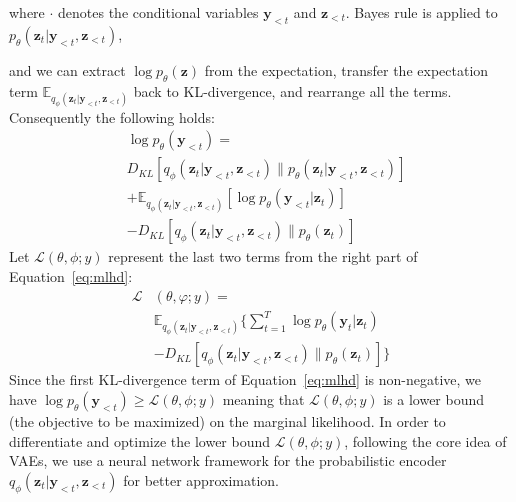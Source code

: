\documentclass[11pt,letterpaper]{article}
\begin{document}
where $\cdot$ denotes the conditional variables $\mathbf{y}_{<t}$ and $\mathbf{z}_{<t}$.
Bayes rule is applied to $p_{\theta}(\mathbf{z}_t|\mathbf{y}_{<t},\mathbf{z}_{<t})$,
\begin{comment}
\begin{equation}
\begin{split}
&{D_{KL}}[q_\phi(\mathbf{z}_t|\mathbf{y}_{<t},\mathbf{z}_{<t})\|p_\theta(\mathbf{z}_t|\mathbf{y}_{<t},\mathbf{z}_{<t})] \\
& = \log {p_\theta }(\mathbf{y}_{<t}) + {\mathbb{E}_{{q_\phi }(\mathbf{z}_t|\cdot)}}[\log {q_\phi }(\mathbf{z}_t|\cdot) \\
& - \log {p_\theta }(\mathbf{y}_{<t}|\mathbf{z}_{t}) - \log {p_\theta }(\mathbf{z}_t)] \\
\end{split}
\end{equation}
\end{comment}
and we can extract $\log {p_\theta }(\mathbf{z})$ from the expectation, transfer the expectation term $\mathbb{E}_{q_\phi(\mathbf{z}_t|\mathbf{y}_{<t},\mathbf{z}_{<t})}$ back to KL-divergence, and rearrange all the terms.
Consequently the following holds:  
\begin{equation}
\begin{split}
&\log {p_\theta }(\mathbf{y}_{<t}) = \\ &{D_{KL}}[q_\phi(\mathbf{z}_t|\mathbf{y}_{<t},\mathbf{z}_{<t})\|p_\theta(\mathbf{z}_t|\mathbf{y}_{<t},\mathbf{z}_{<t})] \\
&+ {\mathbb{E}_{q_\phi(\mathbf{z}_t|\mathbf{y}_{<t},\mathbf{z}_{<t})}}[\log {p_\theta }(\mathbf{y}_{<t}|\mathbf{z}_{t})] \\
&- {D_{KL}}[q_\phi(\mathbf{z}_t|\mathbf{y}_{<t},\mathbf{z}_{<t})\|{p_\theta }(\mathbf{z}_t)]
\end{split}
\label{eq:mlhd}
\end{equation}
Let $\mathcal{L}(\theta ,\phi; y)$ represent the last two terms from the right part of Equation~\ref{eq:mlhd}:
\begin{equation}
\begin{aligned}
\mathcal{L}&(\theta ,\varphi ;y) = \\[0pt] &{\mathbb{E}_{q_\phi(\mathbf{z}_t|\mathbf{y}_{<t},\mathbf{z}_{<t})}}\big\{\sum\nolimits_{t = 1}^T\log {p_\theta }(\mathbf{y}_{t}|\mathbf{z}_{t}) \\[0pt]
&- {D_{KL}}[q_\phi(\mathbf{z}_t|\mathbf{y}_{<t},\mathbf{z}_{<t})\|{p_\theta }(\mathbf{z}_t)]\big\}
\end{aligned}
\label{eq:vlbd}
\end{equation}
Since the first KL-divergence term of Equation~\ref{eq:mlhd} is non-negative, we have $\log {p_\theta }(\mathbf{y}_{<t}) \ge \mathcal{L}(\theta ,\phi ;y)$ meaning that $\mathcal{L}(\theta ,\phi ;y)$ is a lower bound (the objective to be maximized) on the marginal likelihood. In order to differentiate and optimize the lower bound $\mathcal{L}(\theta ,\phi ;y)$, following the core idea of VAEs, we use a neural network framework for the probabilistic encoder $q_{\phi}(\mathbf{z}_t|\mathbf{y}_{<t},\mathbf{z}_{<t})$ for better approximation.
\end{document}
